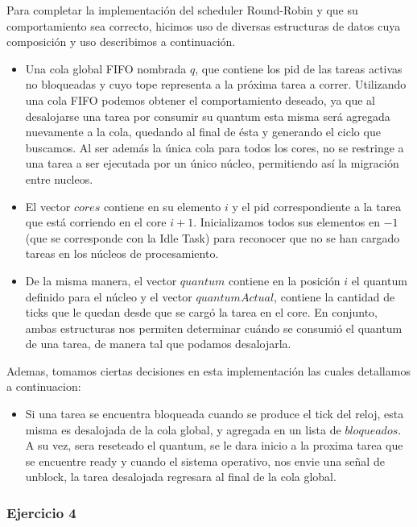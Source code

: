 \indent \indent Para completar la implementación del scheduler Round-Robin y que su comportamiento sea correcto, hicimos uso de diversas estructuras de datos cuya composición y uso describimos a continuación.\\
\begin{itemize}
\item Una cola global FIFO nombrada $q$, que contiene los pid de las tareas activas no bloqueadas y cuyo tope representa a la próxima tarea a correr. 
Utilizando una cola FIFO podemos obtener el comportamiento deseado, ya  que al desalojarse una tarea por consumir su quantum esta misma será agregada nuevamente a la cola, quedando al final de ésta y generando el ciclo que buscamos.
Al ser además la única cola para todos los cores, no se restringe a una tarea a ser ejecutada por un único núcleo, permitiendo así la migración entre nucleos.\\
\item El vector $cores$ contiene en su elemento $i$ y el pid correspondiente a la tarea que está corriendo en el core $i+1$. Inicializamos todos sus elementos en $-1$ (que se corresponde con la Idle Task) para reconocer que no se han cargado tareas en los núcleos de procesamiento.\\
\item De la misma manera, el vector $quantum$ contiene en la posición $i$ el quantum definido para el núcleo y el vector $quantumActual$, contiene la cantidad de ticks que le quedan desde que se cargó la tarea en el core. 
En conjunto, ambas estructuras nos permiten determinar cuándo se consumió el quantum de una tarea, de manera tal que podamos desalojarla.\\
\end{itemize}
\indent Ademas, tomamos ciertas decisiones en esta implementación las cuales detallamos a continuacion:
\begin{itemize}
 \item Si una tarea se encuentra bloqueada cuando se produce el tick del reloj, esta misma es desalojada de la cola global, 
 y agregada en un lista de $bloqueados$. A su vez, sera reseteado el quantum, se le dara inicio a la proxima tarea que se encuentre
 ready y cuando el sistema operativo, nos envie una señal de unblock, la tarea desalojada regresara al final de la cola global.
\end{itemize}


\subsubsection[]{Ejercicio 4}

